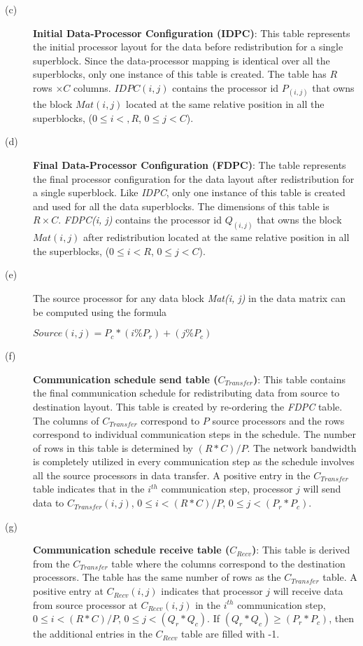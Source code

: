 \documentclass[letterpaper]{llncs}
\begin{document}
\begin{description}
\item[(c)] \textbf{Initial Data-Processor Configuration (IDPC)}: This table represents the initial processor layout for the 
data before redistribution for a single superblock. Since the data-processor mapping is identical over all the superblocks, 
only one instance of this table is created. The table has $R$ rows $\times C$ columns.
$IDPC(i, j)$ contains the processor id $P_{(i, j)}$ that owns the block $Mat(i, j)$ located at the same relative position in all the superblocks, 
($0 \leq i < ,R$, $0 \leq j < C$).

\item[(d)] \textbf{Final Data-Processor Configuration (FDPC)}: The table represents the final processor configuration for 
the data layout after redistribution for a single super\-block. Like \textit{IDPC}, only one instance of this table is 
created and used for all the data superblocks. The dimensions of this table is $R \times C$. \textit{FDPC(i, j)} contains the processor 
id $Q_{(i, j)}$ that owns the block $Mat(i, j)$ after redistribution located at the same relative position in all the superblocks,
($0 \leq i < R$, $0 \leq j< C$).

\item[(e)]The source processor for any data block \textit{Mat(i, j)} in the data matrix can be computed using the formula


\hspace{1.3in}$Source(i,j) = P_{c} \ast(i\% P_{r}) +(j\% P_{c})$

\item[(f)] \textbf{Communication schedule send table ($C_{Transfer}$)}: This table contains the final communication schedule for redistributing 
data from source to destination layout.  This table is created by re-ordering the \textit{FDPC} table. 
The columns of $C_{Transfer}$ correspond to $P$ source processors and the rows correspond to individual 
communication steps in the schedule.
The number of rows in this table is determined by $(R \ast C)/P$. 
The network bandwidth is completely utilized in every communication step as the schedule
involves all the source processors in data transfer. A positive entry in the $C_{Transfer}$ table
indicates that in the $i^{th}$ communication step, processor $j$ will send data to $C_{Transfer}(i,j)$, 
$0 \leq i < (R \ast C)/P$, $0 \leq j < (P_r \ast P_c)$.

\item[(g)] \textbf{Communication schedule receive table ($C_{Recv}$)}: This table is derived from the $C_{Transfer}$ table where the 
columns correspond to the destination processors. The table has the same number of rows as the $C_{Transfer}$ table.  
A positive entry at $C_{Recv}(i,j)$ indicates that processor $j$ will receive data 
from source processor at $C_{Recv}(i,j)$ in the $i^{th}$ communication step, $0 \leq i< (R \ast C)/P$, $0 \leq j < (Q_r \ast Q_c)$. 
If $(Q_{r} \ast Q_{c}) \ge (P_{r} \ast P_{c})$, 
then the additional entries in the $C_{Recv}$ table are filled with -1.

\end{description}
\end{document}

